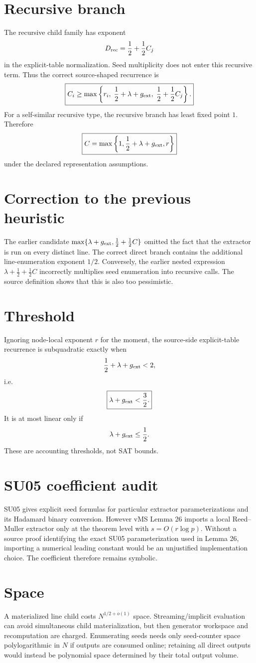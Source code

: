 \documentclass[11pt]{article}
\begin{document}
\section*{Recursive branch}
The recursive child family has exponent
\[
D_{\rm rec}=\frac12+\frac12 C_{j}
\]
in the explicit-table normalization. Seed multiplicity does not enter this recursive term.
Thus the correct source-shaped recurrence is
\[
\boxed{
C_i\ge
\max\left\{
r_i,\;
\frac12+\lambda+g_{\rm ext},\;
\frac12+\frac12C_j
\right\}.
}
\]
For a self-similar recursive type, the recursive branch has least fixed point $1$. Therefore
\[
\boxed{
C=\max\left\{1,\frac12+\lambda+g_{\rm ext},r\right\}
}
\]
under the declared representation assumptions.
\section*{Correction to the previous heuristic}
The earlier candidate $\max\{\lambda+g_{\rm ext},\frac12+\frac12C\}$ omitted the fact that the extractor is run on every distinct line. The correct direct branch contains the additional line-enumeration exponent $1/2$.
Conversely, the earlier nested expression $\lambda+\frac12+\frac12C$ incorrectly multiplies seed enumeration into recursive calls. The source definition shows that this is also too pessimistic.
\section*{Threshold}
Ignoring node-local exponent $r$ for the moment, the source-side explicit-table recurrence is subquadratic exactly when
\[
\frac12+\lambda+g_{\rm ext}<2,
\]
i.e.
\[
\boxed{\lambda+g_{\rm ext}<\frac32.}
\]
It is at most linear only if
\[
\lambda+g_{\rm ext}\le\frac12.
\]
These are accounting thresholds, not SAT bounds.
\section*{SU05 coefficient audit}
SU05 gives explicit seed formulas for particular extractor parameterizations and its Hadamard binary conversion. However vMS Lemma 26 imports a local Reed--Muller extractor only at the theorem level with $s=O(r\log p)$. Without a source proof identifying the exact SU05 parameterization used in Lemma 26, importing a numerical leading constant would be an unjustified implementation choice. The coefficient therefore remains symbolic.
\section*{Space}
A materialized line child costs $N^{1/2+o(1)}$ space. Streaming/implicit evaluation can avoid simultaneous child materialization, but then generator workspace and recomputation are charged. Enumerating seeds needs only seed-counter space polylogarithmic in $N$ if outputs are consumed online; retaining all direct outputs would instead be polynomial space determined by their total output volume.
\end{document}
